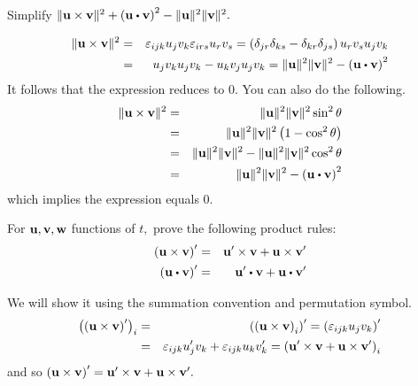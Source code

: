 \begin{enumialphparenastyle}
\begin{ex} Simplify $\vectlength \vect{u}\times \vect{v}\vectlength ^{2}+\tup{
\vect{u}\dotprod \vect{v}} ^{2}-\vectlength \vect{u}\vectlength ^{2}\vectlength
\vect{v}\vectlength ^{2}.$
\begin{sol}
\begin{eqnarray*}
\vectlength \vect{u}\times \vect{v}\vectlength ^{2} &=&\varepsilon
_{ijk}u_{j}v_{k}\varepsilon _{irs}u_{r}v_{s}=\tup{\delta _{jr}\delta
_{ks}-\delta _{kr}\delta _{js}} u_{r}v_{s}u_{j}v_{k} \\
&=&u_{j}v_{k}u_{j}v_{k}-u_{k}v_{j}u_{j}v_{k}=\vectlength \vect{u}
\vectlength ^{2}\vectlength \vect{v}\vectlength ^{2}-\tup{\vect{u}\dotprod \vect{v}} ^{2}
\end{eqnarray*}
It follows that the expression reduces to $0$. You can also do the following.
\begin{eqnarray*}
\vectlength \vect{u}\times \vect{v}\vectlength ^{2} &=&\vectlength \vect{u}
\vectlength ^{2}\vectlength \vect{v}\vectlength ^{2}\sin ^{2}\theta \\
&=&\vectlength \vect{u}\vectlength ^{2}\vectlength \vect{v}\vectlength
^{2}\tup{1-\cos ^{2}\theta } \\
&=&\vectlength \vect{u}\vectlength ^{2}\vectlength \vect{v}\vectlength
^{2}-\vectlength \vect{u}\vectlength ^{2}\vectlength \vect{v}\vectlength
^{2}\cos ^{2}\theta \\
&=&\vectlength \vect{u}\vectlength ^{2}\vectlength \vect{v}\vectlength
^{2}-\tup{\vect{u}\dotprod \vect{v}} ^{2}
\end{eqnarray*}
which implies the expression equals $0$.
\end{sol}
\end{ex}

\begin{ex} For ${\bf u},{\bf v},{\bf w}$ functions of $t,$ prove the following product rules:
\begin{eqnarray*}
\tup{\vect{u}\times \vect{v}} ^{\prime } &=&\vect{u}^{\prime }\times
\vect{v}+\vect{u}\times \vect{v}^{\prime } \\
\tup{\vect{u}\dotprod \vect{v}} ^{\prime } &=&\vect{u}^{\prime }\dotprod
\vect{v}+\vect{u}\dotprod \vect{v}^{\prime }
\end{eqnarray*}
\begin{sol}
We will show it using the summation convention and permutation symbol.
\begin{eqnarray*}
\left(\left({\bf u}\times {\bf v}\right) ^{\prime }\right) _{i} &=
&\left(\left({\bf u}\times {\bf v}\right) _{i}\right) ^{\prime }=\left(
\varepsilon _{ijk}u_{j}v_{k}\right) ^{\prime } \\
&=&\varepsilon _{ijk}u_{j}^{\prime }v_{k}+\varepsilon
_{ijk}u_{k}v_{k}^{\prime }=\left({\bf u}^{\prime } \times
{\bf v}+{\bf u}\times {\bf v}^{\prime }\right) _{i}
\end{eqnarray*}
and so $\left({\bf u}\times {\bf v}\right) ^{\prime }={\bf u}^{\prime }
\times {\bf v}+{\bf u}\times {\bf v}^{\prime }.$ 
\end{sol}
\end{ex}

\end{enumialphparenastyle}